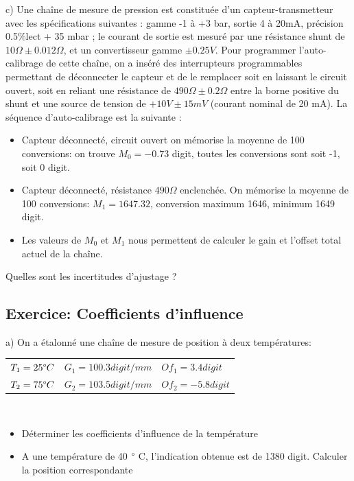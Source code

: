 c)	Une chaîne de mesure de pression est constituée d'un capteur-transmetteur avec les spécifications suivantes : gamme -1 à +3 bar, sortie 4 à 20mA, précision 0.5\%lect + 35 mbar ; le courant de sortie est mesuré par une résistance shunt de $10 \Omega \pm 0.012 \Omega$, et un convertisseur gamme $\pm 0.25V$.
Pour programmer l'auto-calibrage de cette chaîne, on a inséré des interrupteurs programmables permettant de déconnecter le capteur et de le remplacer soit en laissant le circuit ouvert, soit en reliant une résistance de $490 \Omega \pm 0.2 \Omega$ entre la borne positive du shunt et une source de tension de $+10V \pm 15mV$ (courant nominal de 20 mA). La séquence d'auto-calibrage est la suivante :
\begin{itemize}
    \item Capteur déconnecté, circuit ouvert on mémorise la moyenne de 100 conversions: on trouve $M_0=-0.73$ digit, toutes les conversions sont soit -1, soit 0 digit.
    \item Capteur déconnecté, résistance $490 \Omega$ enclenchée. On mémorise la moyenne de 100 conversions: $M_1=1647.32$, conversion maximum 1646, minimum 1649 digit.
    \item Les valeurs de $M_0$ et $M_1$ nous permettent de calculer le gain et l'offset total actuel de la chaîne.
\end{itemize}

Quelles sont les incertitudes d'ajustage ?

\subsection{Exercice: Coefficients d'influence}

a)	On a étalonné une chaîne de mesure de position à deux températures:


\begin {center}
\begin{tabular}{lll}
    $T_1=25 \degree C$ & $G_1= 100.3 digit/mm$  & $Of_1 = 3.4 digit$  \\
    $T_2=75 \degree C$ & $G_2 = 103.5 digit/mm$ & $Of_2 = -5.8 digit$ \\
\end{tabular}
\end{center}
~\\
\begin{itemize}
    \item Déterminer les coefficients d'influence de la température
    \item A une température de 40 $\degree$ C, l'indication obtenue est de 1380 digit. Calculer la position correspondante
\end{itemize}
~\\


